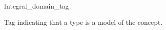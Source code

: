 \begin{ccRefClass}{Integral_domain_tag}
\label{Integral_domain_tag}

\ccDefinition
Tag indicating that a type is a model of the  concept. 

\ccInheritsFrom
{}

\ccIsModel
{}

\ccSeeAlso
{} \\
\\
\end{ccRefClass} 